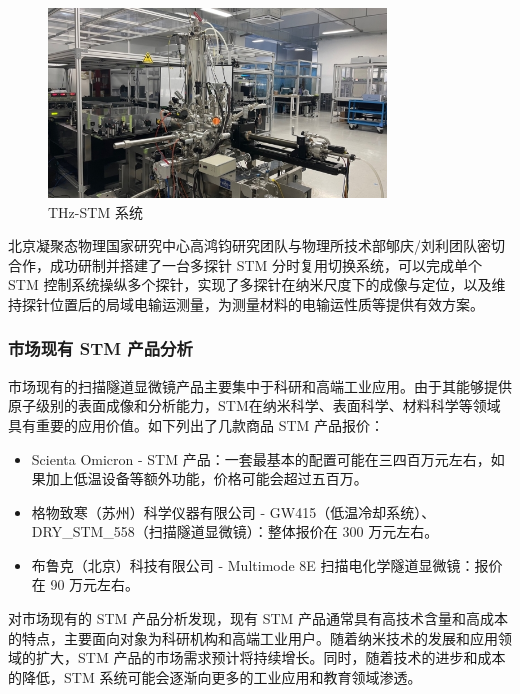 \documentclass[zihao=-4]{ctexart}
\begin{document}
\begin{spacing}{1.5}
		\begin{figure}[htbp]
			\centering 
			\includegraphics[width=0.8\textwidth]{fig7.png}
			\caption{THz-STM 系统}
		\end{figure}
		
		北京凝聚态物理国家研究中心高鸿钧研究团队与物理所技术部郇庆/刘利团队密切合作，成功研制并搭建了一台多探针 STM 分时复用切换系统，可以完成单个 STM 控制系统操纵多个探针，实现了多探针在纳米尺度下的成像与定位，以及维持探针位置后的局域电输运测量\cite{ref10}，为测量材料的电输运性质等提供有效方案。
	
		
		
		\subsubsection[市场现有 STM 产品分析]{市场现有 STM 产品分析}
			市场现有的扫描隧道显微镜产品主要集中于科研和高端工业应用。由于其能够提供原子级别的表面成像和分析能力，STM在纳米科学、表面科学、材料科学等领域具有重要的应用价值。如下列出了几款商品 STM 产品报价：
			\begin{itemize}
				\item Scienta Omicron - STM 产品：一套最基本的配置可能在三四百万元左右，如果加上低温设备等额外功能，价格可能会超过五百万。
				\item 格物致寒（苏州）科学仪器有限公司 - GW415（低温冷却系统）、DRY\_STM\_558（扫描隧道显微镜）：整体报价在 300 万元左右。
				\item 布鲁克（北京）科技有限公司 - Multimode 8E 扫描电化学隧道显微镜：报价在 90 万元左右。
			\end{itemize}
		
		
			对市场现有的 STM 产品分析发现，现有 STM 产品通常具有高技术含量和高成本的特点，主要面向对象为科研机构和高端工业用户。随着纳米技术的发展和应用领域的扩大，STM 产品的市场需求预计将持续增长。同时，随着技术的进步和成本的降低，STM 系统可能会逐渐向更多的工业应用和教育领域渗透。
	
	


\end{spacing}
\end{document}
